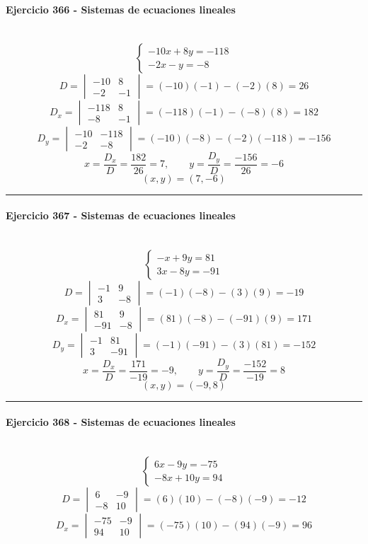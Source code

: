 \documentclass[10pt,a4paper]{article}
\newcommand{\res}[1]{\paragraph{#1}\mbox{}\\[-1.2em]}
\begin{document}
\res{Ejercicio 366 - Sistemas de ecuaciones lineales}
\[ \begin{cases}- 10 x + 8 y=-118\\- 2 x - y=-8\end{cases} \]
\[ D=\begin{vmatrix}-10&8\\-2&-1\end{vmatrix}=(-10)(-1)-(-2)(8)=26 \]
\[ D_x=\begin{vmatrix}-118&8\\-8&-1\end{vmatrix}=(-118)(-1)-(-8)(8)=182 \]
\[ D_y=\begin{vmatrix}-10&-118\\-2&-8\end{vmatrix}=(-10)(-8)-(-2)(-118)=-156 \]
\[ x=\frac{D_x}{D}=\frac{182}{26}=7,\qquad y=\frac{D_y}{D}=\frac{-156}{26}=-6 \]
\[ \boxed{(x,y)=(7,-6)} \]
\vspace{1mm}\hrule\vspace{2mm}
\res{Ejercicio 367 - Sistemas de ecuaciones lineales}
\[ \begin{cases}- x + 9 y=81\\3 x - 8 y=-91\end{cases} \]
\[ D=\begin{vmatrix}-1&9\\3&-8\end{vmatrix}=(-1)(-8)-(3)(9)=-19 \]
\[ D_x=\begin{vmatrix}81&9\\-91&-8\end{vmatrix}=(81)(-8)-(-91)(9)=171 \]
\[ D_y=\begin{vmatrix}-1&81\\3&-91\end{vmatrix}=(-1)(-91)-(3)(81)=-152 \]
\[ x=\frac{D_x}{D}=\frac{171}{-19}=-9,\qquad y=\frac{D_y}{D}=\frac{-152}{-19}=8 \]
\[ \boxed{(x,y)=(-9,8)} \]
\vspace{1mm}\hrule\vspace{2mm}
\res{Ejercicio 368 - Sistemas de ecuaciones lineales}
\[ \begin{cases}6 x - 9 y=-75\\- 8 x + 10 y=94\end{cases} \]
\[ D=\begin{vmatrix}6&-9\\-8&10\end{vmatrix}=(6)(10)-(-8)(-9)=-12 \]
\[ D_x=\begin{vmatrix}-75&-9\\94&10\end{vmatrix}=(-75)(10)-(94)(-9)=96 \]
\end{document}
